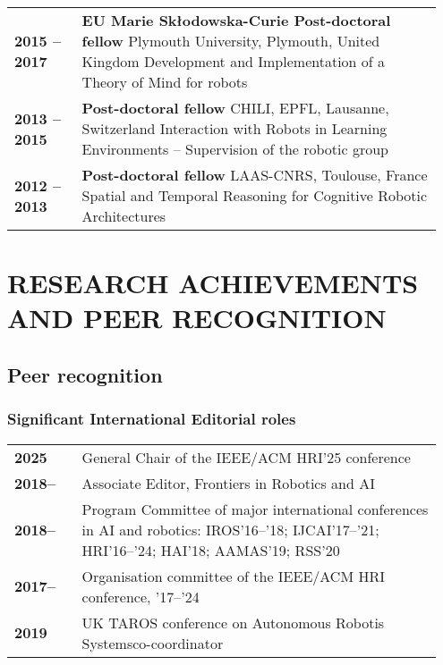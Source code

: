 \begin{tabular}{p{0.15\linewidth}p{0.8\linewidth}}
    \bf 2015 -- 2017 & {\bf EU Marie Skłodowska-Curie Post-doctoral fellow}
    \newline Plymouth University, Plymouth, United Kingdom \newline \small
    Development and Implementation of a Theory of Mind for robots \\
    \bf 2013 -- 2015 & {\bf Post-doctoral fellow} \newline CHILI, EPFL,
    Lausanne, Switzerland \newline \small Interaction with Robots in Learning
    Environments – Supervision of the robotic group \\
    \bf 2012 -- 2013 & {\bf Post-doctoral fellow} \newline LAAS-CNRS, Toulouse,
    France \newline \small Spatial and Temporal Reasoning for Cognitive Robotic
    Architectures\\
\end{tabular}

\section{RESEARCH ACHIEVEMENTS AND PEER RECOGNITION}


\subsection{Peer recognition}


\subsubsection{Significant International Editorial roles}

\begin{tabular}{p{0.15\linewidth}p{0.8\linewidth}}
    {\bf 2025} & {General Chair of the IEEE/ACM HRI'25 conference} \\
    {\bf 2018--} & {Associate Editor, Frontiers in Robotics and AI} \\
    {\bf 2018--} & {Program Committee of major international conferences in AI and
    robotics: IROS'16--'18; IJCAI'17--'21; HRI'16--'24; HAI'18; AAMAS'19;
    RSS'20} \\
    {\bf 2017--} & {Organisation committee of the IEEE/ACM HRI conference, '17--'24} \\
    {\bf 2019} & {UK TAROS conference on Autonomous Robotis Systems}{co-coordinator} \\
\end{tabular}

